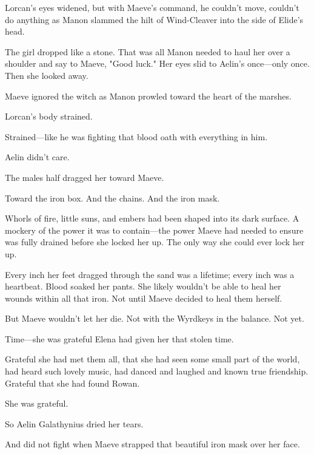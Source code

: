Lorcan's eyes widened, but with Maeve's command, he couldn't move, couldn't do anything as Manon slammed the hilt of Wind-Cleaver into the side of Elide's head.

The girl dropped like a stone.
That was all Manon needed to haul her over a shoulder and say to Maeve, "Good luck."
Her eyes slid to Aelin's once---only once.
Then she looked away.

Maeve ignored the witch as Manon prowled toward the heart of the marshes.

Lorcan's body strained.

Strained---like he was fighting that blood oath with everything in him.

Aelin didn't care.

The males half dragged her toward Maeve.

Toward the iron box.
And the chains.
And the iron mask.

Whorls of fire, little suns, and embers had been shaped into its dark surface.
A mockery of the power it was to contain---the power Maeve had needed to ensure was fully drained before she locked her up.
The only way she could ever lock her up.

Every inch her feet dragged through the sand was a lifetime; every inch was a heartbeat.
Blood soaked her pants.
She likely wouldn't be able to heal her wounds within all that iron.
Not until Maeve decided to heal them herself.

But Maeve wouldn't let her die.
Not with the Wyrdkeys in the balance.
Not yet.

Time---she was grateful Elena had given her that stolen time.

Grateful she had met them all, that she had seen some small part of the world, had heard such lovely music, had danced and laughed and known true friendship.
Grateful that she had found Rowan.

She was grateful.

So Aelin Galathynius dried her tears.

And did not fight when Maeve strapped that beautiful iron mask over her face.
